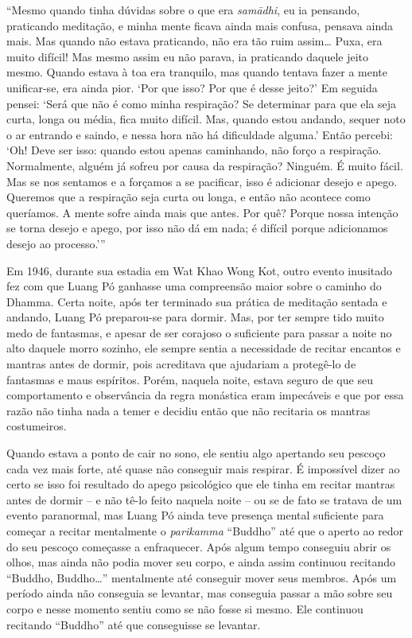 ``Mesmo quando tinha dúvidas sobre o que era \emph{samādhi}, eu ia
pensando, praticando meditação, e minha mente ficava ainda mais confusa,
pensava ainda mais. Mas quando não estava praticando, não era tão ruim
assim\ldots{} Puxa, era muito difícil! Mas mesmo assim eu não parava, ia
praticando daquele jeito mesmo. Quando estava à toa era tranquilo, mas
quando tentava fazer a mente unificar-se, era ainda pior. `Por que isso?
Por que é desse jeito?' Em seguida pensei: `Será que não é como minha
respiração? Se determinar para que ela seja curta, longa ou média, fica
muito difícil. Mas, quando estou andando, sequer noto o ar entrando e
saindo, e nessa hora não há dificuldade alguma.' Então percebi: `Oh!
Deve ser isso: quando estou apenas caminhando, não forço a respiração.
Normalmente, alguém já sofreu por causa da respiração? Ninguém. É muito
fácil. Mas se nos sentamos e a forçamos a se pacificar, isso é adicionar
desejo e apego. Queremos que a respiração seja curta ou longa, e então
não acontece como queríamos. A mente sofre ainda mais que antes. Por
quê? Porque nossa intenção se torna desejo e apego, por isso não dá em
nada; é difícil porque adicionamos desejo ao processo.'\thinspace ''

Em 1946, durante sua estadia em Wat Khao Wong Kot, outro evento
inusitado fez com que Luang Pó ganhasse uma compreensão maior sobre o
caminho do Dhamma. Certa noite, após ter terminado sua prática de
meditação sentada e andando, Luang Pó preparou-se para dormir. Mas, por
ter sempre tido muito medo de fantasmas, e apesar de ser corajoso o
suficiente para passar a noite no alto daquele morro sozinho, ele sempre
sentia a necessidade de recitar encantos e mantras antes de dormir, pois
acreditava que ajudariam a protegê-lo de fantasmas e maus espíritos.
Porém, naquela noite, estava seguro de que seu comportamento e
observância da regra monástica eram impecáveis e que por essa razão não
tinha nada a temer e decidiu então que não recitaria os mantras
costumeiros.

Quando estava a ponto de cair no sono, ele sentiu algo apertando seu
pescoço cada vez mais forte, até quase não conseguir mais respirar. É
impossível dizer ao certo se isso foi resultado do apego psicológico que
ele tinha em recitar mantras antes de dormir -- e não tê-lo feito
naquela noite -- ou se de fato se tratava de um evento paranormal, mas
Luang Pó ainda teve presença mental suficiente para começar a recitar
mentalmente o \emph{parikamma} ``Buddho'' até que o aperto ao redor do
seu pescoço começasse a enfraquecer. Após algum tempo conseguiu abrir os
olhos, mas ainda não podia mover seu corpo, e ainda assim continuou
recitando ``Buddho, Buddho\ldots{}'' mentalmente até conseguir mover
seus membros. Após um período ainda não conseguia se levantar, mas
conseguia passar a mão sobre seu corpo e nesse momento sentiu como se
não fosse si mesmo. Ele continuou recitando ``Buddho'' até que
conseguisse se levantar.

